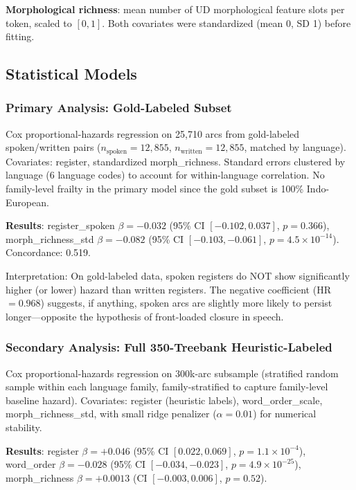 \documentclass[11pt,letterpaper]{article}
\begin{document}
\textbf{Morphological richness}: mean number of UD morphological feature slots per token, scaled to $[0,1]$. Both covariates were standardized (mean 0, SD 1) before fitting.

\subsection{Statistical Models}

\subsubsection{Primary Analysis: Gold-Labeled Subset}

Cox proportional-hazards regression on 25,710 arcs from gold-labeled spoken/written pairs ($n_{\text{spoken}}=12{,}855$, $n_{\text{written}}=12{,}855$, matched by language). Covariates: register, standardized morph\_richness. Standard errors clustered by language (6 language codes) to account for within-language correlation. No family-level frailty in the primary model since the gold subset is 100\% Indo-European.

\textbf{Results}: register\_spoken $\beta=-0.032$ (95\% CI $[-0.102, 0.037]$, $p=0.366$), morph\_richness\_std $\beta=-0.082$ (95\% CI $[-0.103, -0.061]$, $p=4.5\times10^{-14}$). Concordance: 0.519.

Interpretation: On gold-labeled data, spoken registers do NOT show significantly higher (or lower) hazard than written registers. The negative coefficient (HR $=0.968$) suggests, if anything, spoken arcs are slightly more likely to persist longer---opposite the hypothesis of front-loaded closure in speech.

\subsubsection{Secondary Analysis: Full 350-Treebank Heuristic-Labeled}

Cox proportional-hazards regression on 300k-arc subsample (stratified random sample within each language family, family-stratified to capture family-level baseline hazard). Covariates: register (heuristic labels), word\_order\_scale, morph\_richness\_std, with small ridge penalizer ($\alpha=0.01$) for numerical stability.

\textbf{Results}: register $\beta=+0.046$ (95\% CI $[0.022, 0.069]$, $p=1.1\times10^{-4}$), word\_order $\beta=-0.028$ (95\% CI $[-0.034, -0.023]$, $p=4.9\times10^{-25}$), morph\_richness $\beta=+0.0013$ (CI $[-0.003, 0.006]$, $p=0.52$).
\end{document}
